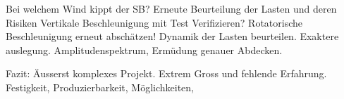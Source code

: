 Bei welchem Wind kippt der SB?
Erneute Beurteilung der Lasten und deren Risiken
Vertikale Beschleunigung mit Test Verifizieren?
Rotatorische Beschleunigung erneut abschätzen!
Dynamik der Lasten beurteilen. Exaktere auslegung. Amplitudenspektrum, Ermüdung genauer Abdecken.

Fazit: Äusserst komplexes Projekt. Extrem Gross und fehlende Erfahrung. Festigkeit, Produzierbarkeit, Möglichkeiten,
